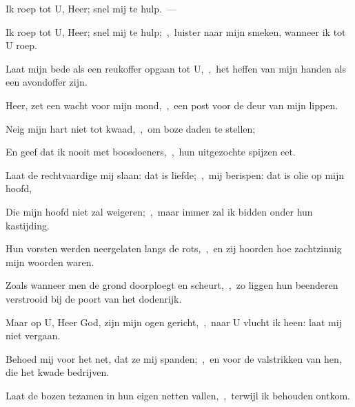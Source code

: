\documentclass[12pt,twoside,a5paper]{article}
\begin{document}


\begin{halfparskip}
   Ik roep tot U, Heer; snel mij te hulp.~--- 

  Ik roep tot U, Heer; snel mij te hulp;~\sep\ luister naar mijn smeken, wanneer ik tot U roep.

  Laat mijn bede als een reukoffer opgaan tot U,~\sep\ het heffen van mijn handen als een avondoffer zijn.

  Heer, zet een wacht voor mijn mond,~\sep\ een post voor de deur van mijn lippen.

  Neig mijn hart niet tot kwaad,~\sep\ om boze daden te stellen;

  En geef dat ik nooit met boosdoeners,~\sep\ hun uitgezochte spijzen eet.

  Laat de rechtvaardige mij slaan: dat is liefde;~\sep\ mij berispen: dat is olie op mijn hoofd,

  Die mijn hoofd niet zal weigeren;~\sep\ maar immer zal ik bidden onder hun kastijding.

  Hun vorsten werden neergelaten langs de rots,~\sep\ en zij hoorden hoe zachtzinnig mijn woorden waren.

  Zoals wanneer men de grond doorploegt en scheurt,~\sep\ zo liggen hun beenderen verstrooid bij de poort van het dodenrijk.

  Maar op U, Heer God, zijn mijn ogen gericht,~\sep\ naar U vlucht ik heen: laat mij niet vergaan.

  Behoed mij voor het net, dat ze mij spanden;~\sep\ en voor de valstrikken van hen, die het kwade bedrijven.

  Laat de bozen tezamen in hun eigen netten vallen,~\sep\ terwijl ik behouden ontkom.
\end{halfparskip}
\end{document}
